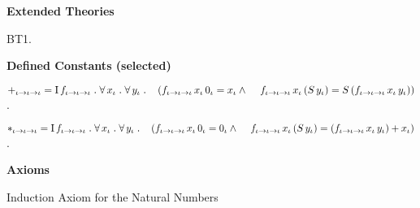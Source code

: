 \begin{biformthy}\em

\bi

  \item[]

  \item[] \textbf{Extended Theories} 

  \be

    \setcounter{enumi}{0}

    \item BT1.

  \ee

  \item[] \textbf{Defined Constants (selected)}

  \be

    \setcounter{enumi}{8}

    \item $+_{\iota \rightarrow \iota \rightarrow \iota} =
    \mbox{\rm I}\, f_{\iota \rightarrow \iota \rightarrow \iota} \mathrel.
    \forall\, x_\iota \mathrel. \forall\, y_\iota \mathrel. {}\\
    \hspace*{2ex} (f_{\iota \rightarrow \iota \rightarrow \iota} \, 
    x_\iota \, 0_\iota = x_\iota \wedge {}\\
    \hspace*{2.8ex}f_{\iota \rightarrow \iota \rightarrow \iota} \, 
    x_\iota \, (S \, y_\iota) = S \, 
    (f_{\iota \rightarrow \iota \rightarrow \iota} \, x_\iota \,
    y_\iota))$.

    \item $*_{\iota \rightarrow \iota \rightarrow \iota} =
    \mbox{\rm I}\, f_{\iota \rightarrow \iota \rightarrow \iota} \mathrel.
    \forall\, x_\iota \mathrel. \forall\, y_\iota \mathrel. {}\\
    \hspace*{2ex} (f_{\iota \rightarrow \iota \rightarrow \iota} \, 
    x_\iota \, 0_\iota = 0_\iota \wedge {}\\
    \hspace*{2.8ex}f_{\iota \rightarrow \iota \rightarrow \iota} \, 
    x_\iota \, (S \, y_\iota) =  
    (f_{\iota \rightarrow \iota \rightarrow \iota} \, x_\iota \,
    y_\iota) + x_\iota)$.

  \ee



  \item[] \textbf{Axioms}

  \be

    \setcounter{enumi}{31}

    \item Induction Axiom for the Natural Numbers


\end{biformthy}
